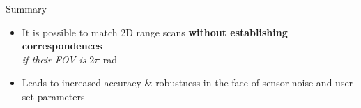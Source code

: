 \begin{frame}[noframenumbering]{Summary}

\begin{overlayarea}{\textwidth}{3cm}
\leavevmode
  \begin{itemize}
    \item It is possible to match 2D range scans \textbf{without establishing correspondences}\\
          \textit{if their FOV is} $2\pi$ rad
    \item<2|only@2> Leads to increased accuracy \& robustness in the face of sensor noise and user-set parameters
  \end{itemize}

\end{overlayarea}
\end{frame}
